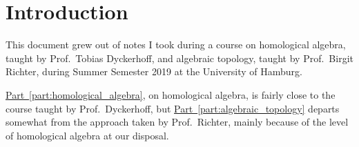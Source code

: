 \documentclass[main.tex]{subfiles}
\begin{document}
\setcounter{chapter}{-1}
\chapter{Introduction}
\label{ch:introduction}

This document grew out of notes I took during a course on homological algebra, taught by Prof.\ Tobias Dyckerhoff, and algebraic topology, taught by Prof.\ Birgit Richter, during Summer Semester 2019 at the University of Hamburg.

\hyperref[part:homological_algebra]{Part~\ref*{part:homological_algebra}}, on homological algebra, is fairly close to the course taught by Prof.\ Dyckerhoff, but \hyperref[part:algebraic_topology]{Part~\ref*{part:algebraic_topology}} departs somewhat from the approach taken by Prof.\ Richter, mainly because of the level of homological algebra at our disposal.
\end{document}
